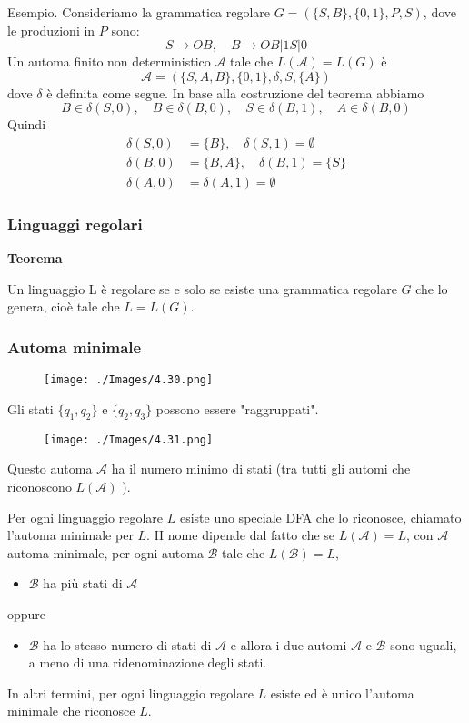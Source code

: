 Esempio. Consideriamo la grammatica regolare $G=(\{S, B\},\{0,1\}, P, S)$, dove le produzioni in $P$ sono:
$$
S \rightarrow O B, \quad B \rightarrow O B|1 S| 0
$$
Un automa finito non deterministico $\mathcal{A}$ tale che $L(\mathcal{A})=L(G)$ è
$$
\mathcal{A}=(\{S, A, B\},\{0,1\}, \delta, S,\{A\})
$$
dove $\delta$ è definita come segue.
In base alla costruzione del teorema abbiamo
$$
B \in \delta(S, 0), \quad B \in \delta(B, 0), \quad S \in \delta(B, 1), \quad A \in \delta(B, 0)
$$
Quindi
$$
\begin{aligned}
\delta(S, 0) &=\{B\}, \quad \delta(S, 1)=\emptyset \\
\delta(B, 0) &=\{B, A\}, \quad \delta(B, 1)=\{S\} \\
\delta(A, 0) &=\delta(A, 1)=\emptyset
\end{aligned}
$$

\subsubsection{Linguaggi regolari}

\textbf{Teorema}

Un linguaggio L è regolare se e solo se esiste una grammatica regolare $G$ che lo genera, cioè tale che $L=L(G)$.

\subsubsection{Automa minimale}

\begin{figure}[hbpt!]
    \centering
    \texttt{[image: ./Images/4.30.png]}
\end{figure}
\FloatBarrier

Gli stati $\{q_1, q_2\}$ e $\{q_2, q_3\}$ possono essere "raggruppati".

\begin{figure}[hbpt!]
    \centering
    \texttt{[image: ./Images/4.31.png]}
\end{figure}
\FloatBarrier

Questo automa $\mathcal{A}$ ha il numero minimo di stati (tra tutti gli automi che riconoscono $L(\mathcal{A})$ ).

Per ogni linguaggio regolare $L$ esiste uno speciale DFA che lo riconosce, chiamato l'automa minimale per $L$.
II nome dipende dal fatto che se $L(\mathcal{A})=L$, con $\mathcal{A}$ automa minimale, per ogni automa $\mathcal{B}$ tale che $L(\mathcal{B})=L$,
\begin{itemize}
    \item $\mathcal{B}$ ha più stati di $\mathcal{A}$
\end{itemize}
oppure
\begin{itemize}
    \item $\mathcal{B}$ ha lo stesso numero di stati di $\mathcal{A}$ e allora i due automi $\mathcal{A}$ e $\mathcal{B}$ sono uguali, a meno di una ridenominazione degli stati.
\end{itemize}
In altri termini, per ogni linguaggio regolare $L$ esiste ed è unico l'automa minimale che riconosce $L$.

